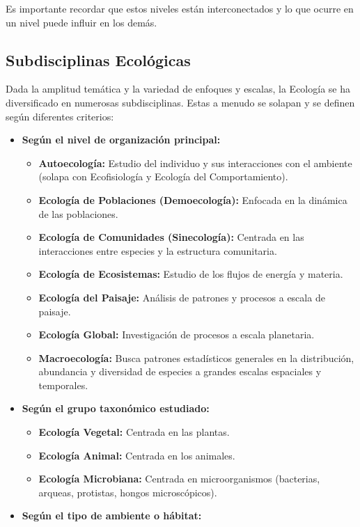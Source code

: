 \documentclass[
]{book}
\providecommand{\tightlist}{%
  \setlength{\itemsep}{0pt}\setlength{\parskip}{0pt}}
\begin{document}
Es importante recordar que estos niveles están interconectados y lo que ocurre en un nivel puede influir en los demás.

\subsection*{\texorpdfstring{\textbf{Subdisciplinas Ecológicas}}{Subdisciplinas Ecológicas}}\label{subdisc}

Dada la amplitud temática y la variedad de enfoques y escalas, la Ecología se ha diversificado en numerosas subdisciplinas. Estas a menudo se solapan y se definen según diferentes criterios:

\begin{itemize}
\tightlist
\item
  \textbf{Según el nivel de organización principal:}

  \begin{itemize}
  \tightlist
  \item
    \textbf{Autoecología:} Estudio del individuo y sus interacciones con el ambiente (solapa con Ecofisiología y Ecología del Comportamiento).
  \item
    \textbf{Ecología de Poblaciones (Demoecología):} Enfocada en la dinámica de las poblaciones.
  \item
    \textbf{Ecología de Comunidades (Sinecología):} Centrada en las interacciones entre especies y la estructura comunitaria.
  \item
    \textbf{Ecología de Ecosistemas:} Estudio de los flujos de energía y materia.
  \item
    \textbf{Ecología del Paisaje:} Análisis de patrones y procesos a escala de paisaje.
  \item
    \textbf{Ecología Global:} Investigación de procesos a escala planetaria.
  \item
    \textbf{Macroecología:} Busca patrones estadísticos generales en la distribución, abundancia y diversidad de especies a grandes escalas espaciales y temporales.
  \end{itemize}
\item
  \textbf{Según el grupo taxonómico estudiado:}

  \begin{itemize}
  \tightlist
  \item
    \textbf{Ecología Vegetal:} Centrada en las plantas.
  \item
    \textbf{Ecología Animal:} Centrada en los animales.
  \item
    \textbf{Ecología Microbiana:} Centrada en microorganismos (bacterias, arqueas, protistas, hongos microscópicos).
  \end{itemize}
\item
  \textbf{Según el tipo de ambiente o hábitat:}


\end{itemize}
\end{document}
